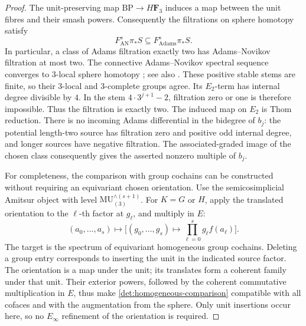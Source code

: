 \documentclass[11pt]{article}
\theoremstyle{definition}
\theoremstyle{remark}
\numberwithin{equation}{section}
\begin{document}
\begin{proof}
The unit-preserving map \(\mathrm{BP}\to H\mathbf F_3\) induces a map between the
unit fibres and their smash powers.  Consequently the filtrations
on sphere homotopy satisfy
\begin{equation}\label{det:filtration-inclusion}
 F_{\mathrm{AN}}^s\pi_*S
 \subseteq F_{\mathrm{Adams}}^s\pi_*S .
\end{equation}
In particular, a class of Adams filtration exactly two has
Adams--Novikov filtration at most two.  The connective
Adams--Novikov spectral sequence converges to \(3\)-local sphere homotopy
\cite[Theorems~2.2.3 and~2.2.13--14]{Ravenel}; see also
\cite[p.~475, after Equation~(1.10)]{MRW}.
These positive stable stems are finite, so their \(3\)-local and
\(3\)-complete groups agree.  Its \(E_2\)-term
has internal degree divisible by \(4\).  In the stem
\(4\cdot3^{j+1}-2\), filtration zero or one is therefore impossible.
Thus the filtration is exactly two.
The induced map on \(E_2\) is Thom reduction.
There is no incoming Adams differential in the bidegree of \(b_j\):
the potential length-two source has filtration zero and positive
odd internal degree, and longer sources have negative filtration.
The associated-graded image of the chosen class consequently
gives the asserted nonzero multiple of \(b_j\).

For completeness, the comparison with group cochains can be
constructed without requiring an equivariant chosen orientation.
Use the semicosimplicial Amitsur object with level
\(\mathrm{MU}_{(3)}^{\wedge(s+1)}\).
For \(K=G\) or \(H\), apply the translated orientation to the
\(\ell\)-th factor at \(g_\ell\), and multiply in \(E\):
\begin{equation}\label{det:homogeneous-comparison}
 (a_0,\ldots,a_s)\longmapsto
 \bigl[(g_0,\ldots,g_s)\longmapsto
       \prod_{\ell=0}^s g_\ell f(a_\ell)\bigr].
\end{equation}
The target is the spectrum of equivariant homogeneous group
cochains.  Deleting a group entry corresponds to inserting the unit
in the indicated source factor.
The orientation is a map under the unit; its translates form a
coherent family under that unit.  Their exterior powers, followed
by the coherent commutative multiplication in \(E\), thus make
\eqref{det:homogeneous-comparison} compatible with all cofaces and
with the augmentation from the sphere.
Only unit insertions occur here, so no \(E_\infty\) refinement of
the orientation is required.


\end{proof}
\end{document}
